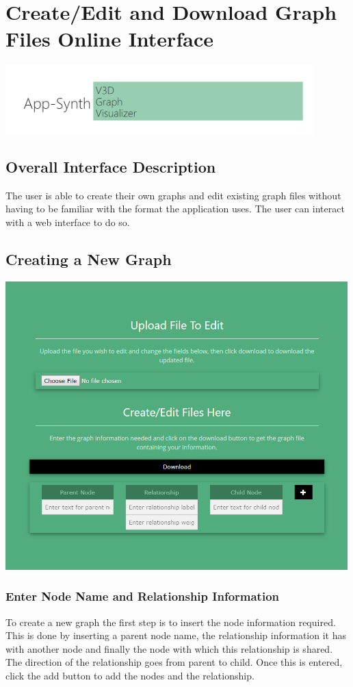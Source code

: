 \documentclass[english]{article}
\begin{document}
\section{Create/Edit and Download Graph Files Online Interface}

\includegraphics[width=450px]{InterfaceScreenshots/InterfaceCoverPage.PNG}

\subsection{Overall Interface Description}
The user is able to create their own graphs and edit existing graph files without having to be familiar with the format the application uses. The user can interact with a web interface to do so.

\subsection{Creating a New Graph}

\includegraphics[width=500px]{InterfaceScreenshots/EmptyInfo.PNG}

\subsubsection{Enter Node Name and Relationship Information}
To create a new graph the first step is to insert the node information required. This is done by inserting a parent node name, the relationship information it has with another node and finally the node with which this relationship is shared. The direction of the relationship goes from parent to child. Once this is entered, click the add button to add the nodes and the relationship.
\end{document}
